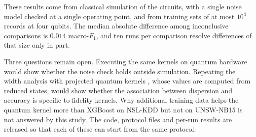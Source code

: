 These results come from classical simulation of the circuits, with a single noise model
checked at a single operating point, and from training sets of at most $10^4$ records at four
qubits. The median absolute difference among inconclusive comparisons is $0.014$ macro-$F_1$, and ten
runs per comparison resolve differences of that size only in part.

Three questions remain open. Executing the same kernels on quantum hardware would show whether
the noise check holds outside simulation. Repeating the width analysis with projected quantum
kernels \cite{ref19}, whose values are computed from reduced states, would show whether the
association between dispersion and accuracy is specific to fidelity kernels. Why additional
training data helps the quantum kernel more than XGBoost on NSL-KDD but not on UNSW-NB15 is
not answered by this study. The code, protocol files and per-run results are released so that
each of these can start from the same protocol.
